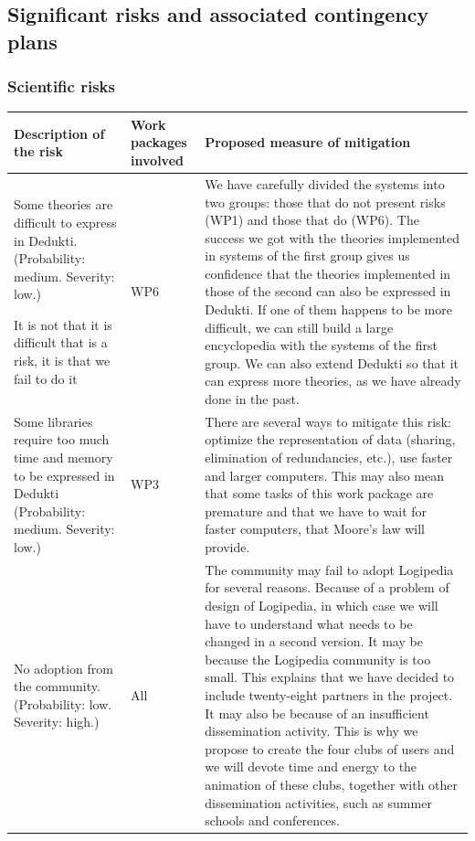 \subsection*{Significant risks and associated contingency plans}
\label{sec:risks}

\subsubsection*{Scientific risks}

\begin{longtable}{|p{}|p{}|p{}|}
\hline
{\bf Description of the risk}
&
{\bf Work packages involved}
&
{\bf Proposed measure of mitigation}
\\
\hline
Some theories are difficult to express in Dedukti.
(Probability: medium. Severity: low.)

{\color{red} It is not that it is difficult that is a risk, it is
that we fail to do it}
&
WP6
&
We have carefully divided the systems into two groups: those that do not
present risks (WP1) and those that do (WP6). The success we got with the
theories implemented in systems of the first group gives us confidence
that the theories implemented in those of the second can also be
expressed in Dedukti.  If one of them happens to be more difficult, we
can still build a large encyclopedia with the systems of the first
group. We can also extend Dedukti so that it can express more theories,
as we have already done in the past.
\\
\hline
Some libraries require too much time and memory
to be expressed in Dedukti (Probability: medium. Severity: low.)
&
WP3
&
There are several ways to mitigate this risk: optimize the
representation of data (sharing, elimination of redundancies, etc.), 
use faster and larger computers. This may also mean that some tasks
of this work package are premature and that we have to wait for
faster computers, that Moore's law will provide.
\\
\hline
No adoption from the community. (Probability: low. Severity: high.)
&
All 
&
The community may fail to adopt Logipedia for several reasons. Because
of a problem of design of Logipedia, in which case we will have to
understand what needs to be changed in a second version.  It may be
because the Logipedia community is too small.  This explains that we
have decided to include twenty-eight partners in the project.  It may
also be because of an insufficient dissemination activity.  This is
why we propose to create the four clubs of users and we will devote
time and energy to the animation of these clubs, together with other
dissemination activities, such as summer schools and conferences.
\\
\hline
\end{longtable}

